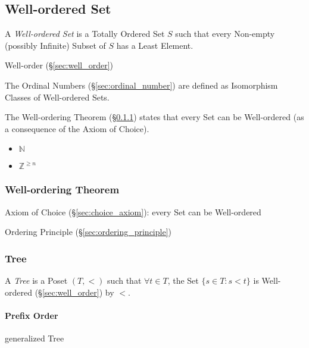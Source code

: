 \subsection{Well-ordered Set}\label{sec:wellordered_set}

A \emph{Well-ordered Set} is a Totally Ordered Set $S$ such that every
Non-empty (possibly Infinite) Subset of $S$ has a Least Element.

Well-order (\S\ref{sec:well_order})

The Ordinal Numbers (\S\ref{sec:ordinal_number}) are defined as
Isomorphism Classes of Well-ordered Sets.

The Well-ordering Theorem (\S\ref{sec:wellorder_theorem}) states that
every Set can be Well-ordered (as a consequence of the Axiom of
Choice).

\begin{itemize}
  \item $\mathbb{N}$
  \item $\mathbb{Z}^{\geq n}$
\end{itemize}



\subsubsection{Well-ordering Theorem}\label{sec:wellorder_theorem}

Axiom of Choice (\S\ref{sec:choice_axiom}): every Set can be
Well-ordered

Ordering Principle (\S\ref{sec:ordering_principle})



\subsubsection{Tree} \label{sec:tree}

A \emph{Tree} is a Poset $(T,<)$ such that $\forall t \in T$, the Set
$\{s \in T : s < t \}$ is Well-ordered (\S\ref{sec:well_order}) by
$<$.



\paragraph{Prefix Order}\label{sec:prefix_order}\hfill

generalized Tree



